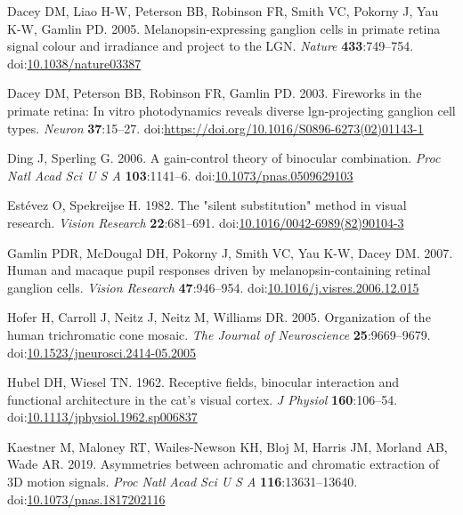 \documentclass[
]{article}
\begin{document}
\leavevmode\hypertarget{ref-Dacey2005}{}%
Dacey DM, Liao H-W, Peterson BB, Robinson FR, Smith VC, Pokorny J, Yau K-W, Gamlin PD. 2005. Melanopsin-expressing ganglion cells in primate retina signal colour and irradiance and project to the LGN. \emph{Nature} \textbf{433}:749--754. doi:\href{https://doi.org/10.1038/nature03387}{10.1038/nature03387}

\leavevmode\hypertarget{ref-Dacey2003}{}%
Dacey DM, Peterson BB, Robinson FR, Gamlin PD. 2003. Fireworks in the primate retina: In vitro photodynamics reveals diverse lgn-projecting ganglion cell types. \emph{Neuron} \textbf{37}:15--27. doi:\href{https://doi.org/https://doi.org/10.1016/S0896-6273(02)01143-1}{https://doi.org/10.1016/S0896-6273(02)01143-1}

\leavevmode\hypertarget{ref-Ding2006}{}%
Ding J, Sperling G. 2006. A gain-control theory of binocular combination. \emph{Proc Natl Acad Sci U S A} \textbf{103}:1141--6. doi:\href{https://doi.org/10.1073/pnas.0509629103}{10.1073/pnas.0509629103}

\leavevmode\hypertarget{ref-Estevez1982}{}%
Estévez O, Spekreijse H. 1982. The "silent substitution" method in visual research. \emph{Vision Research} \textbf{22}:681--691. doi:\href{https://doi.org/10.1016/0042-6989(82)90104-3}{10.1016/0042-6989(82)90104-3}

\leavevmode\hypertarget{ref-Gamlin2007}{}%
Gamlin PDR, McDougal DH, Pokorny J, Smith VC, Yau K-W, Dacey DM. 2007. Human and macaque pupil responses driven by melanopsin-containing retinal ganglion cells. \emph{Vision Research} \textbf{47}:946--954. doi:\href{https://doi.org/10.1016/j.visres.2006.12.015}{10.1016/j.visres.2006.12.015}

\leavevmode\hypertarget{ref-Hofer2005}{}%
Hofer H, Carroll J, Neitz J, Neitz M, Williams DR. 2005. Organization of the human trichromatic cone mosaic. \emph{The Journal of Neuroscience} \textbf{25}:9669--9679. doi:\href{https://doi.org/10.1523/jneurosci.2414-05.2005}{10.1523/jneurosci.2414-05.2005}

\leavevmode\hypertarget{ref-Hubel1962}{}%
Hubel DH, Wiesel TN. 1962. Receptive fields, binocular interaction and functional architecture in the cat's visual cortex. \emph{J Physiol} \textbf{160}:106--54. doi:\href{https://doi.org/10.1113/jphysiol.1962.sp006837}{10.1113/jphysiol.1962.sp006837}

\leavevmode\hypertarget{ref-Kaestner2019}{}%
Kaestner M, Maloney RT, Wailes-Newson KH, Bloj M, Harris JM, Morland AB, Wade AR. 2019. Asymmetries between achromatic and chromatic extraction of 3D motion signals. \emph{Proc Natl Acad Sci U S A} \textbf{116}:13631--13640. doi:\href{https://doi.org/10.1073/pnas.1817202116}{10.1073/pnas.1817202116}
\end{document}
